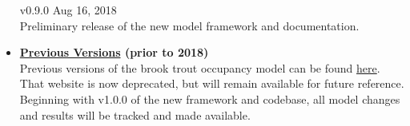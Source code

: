 \documentclass[
]{book}
\begin{document}
\begin{itemize}
  v0.9.0 \textbar{} Aug 16, 2018\\
  Preliminary release of the new model framework and documentation.
\item
  \textbf{\href{http://conte-ecology.github.io/Northeast_Bkt_Occupancy/}{Previous Versions} (prior to 2018)}\\
  Previous versions of the brook trout occupancy model can be found \href{http://conte-ecology.github.io/Northeast_Bkt_Occupancy/}{here}. That website is now deprecated, but will remain available for future reference. Beginning with v1.0.0 of the new framework and codebase, all model changes and results will be tracked and made available.
\end{itemize}

  
\end{document}
